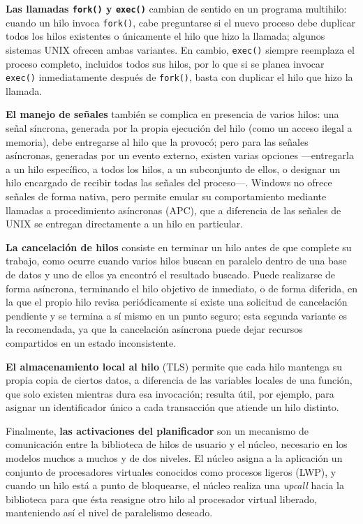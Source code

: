 \documentclass[12pt,letterpaper]{article}
\begin{document}
\textbf{Las llamadas \texttt{fork()} y \texttt{exec()}} cambian de sentido en un programa multihilo: cuando un hilo invoca \texttt{fork()}, cabe preguntarse si el nuevo proceso debe duplicar todos los hilos existentes o únicamente el hilo que hizo la llamada; algunos sistemas UNIX ofrecen ambas variantes. En cambio, \texttt{exec()} siempre reemplaza el proceso completo, incluidos todos sus hilos, por lo que si se planea invocar \texttt{exec()} inmediatamente después de \texttt{fork()}, basta con duplicar el hilo que hizo la llamada.

\textbf{El manejo de señales} también se complica en presencia de varios hilos: una señal síncrona, generada por la propia ejecución del hilo (como un acceso ilegal a memoria), debe entregarse al hilo que la provocó; pero para las señales asíncronas, generadas por un evento externo, existen varias opciones —entregarla a un hilo específico, a todos los hilos, a un subconjunto de ellos, o designar un hilo encargado de recibir todas las señales del proceso—. Windows no ofrece señales de forma nativa, pero permite emular su comportamiento mediante llamadas a procedimiento asíncronas (APC), que a diferencia de las señales de UNIX se entregan directamente a un hilo en particular.

\textbf{La cancelación de hilos} consiste en terminar un hilo antes de que complete su trabajo, como ocurre cuando varios hilos buscan en paralelo dentro de una base de datos y uno de ellos ya encontró el resultado buscado. Puede realizarse de forma asíncrona, terminando el hilo objetivo de inmediato, o de forma diferida, en la que el propio hilo revisa periódicamente si existe una solicitud de cancelación pendiente y se termina a sí mismo en un punto seguro; esta segunda variante es la recomendada, ya que la cancelación asíncrona puede dejar recursos compartidos en un estado inconsistente.

\textbf{El almacenamiento local al hilo} (TLS) permite que cada hilo mantenga su propia copia de ciertos datos, a diferencia de las variables locales de una función, que solo existen mientras dura esa invocación; resulta útil, por ejemplo, para asignar un identificador único a cada transacción que atiende un hilo distinto.

Finalmente, \textbf{las activaciones del planificador} son un mecanismo de comunicación entre la biblioteca de hilos de usuario y el núcleo, necesario en los modelos muchos a muchos y de dos niveles. El núcleo asigna a la aplicación un conjunto de procesadores virtuales conocidos como procesos ligeros (LWP), y cuando un hilo está a punto de bloquearse, el núcleo realiza una \textit{upcall} hacia la biblioteca para que ésta reasigne otro hilo al procesador virtual liberado, manteniendo así el nivel de paralelismo deseado.
\end{document}
